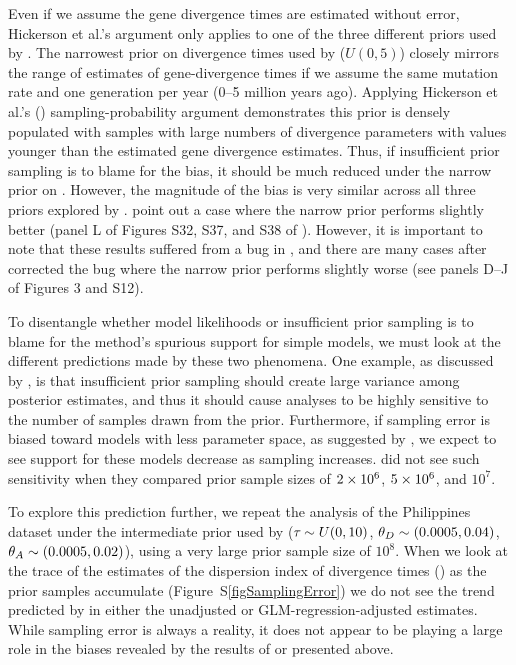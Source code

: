 Even if we assume the gene divergence times are estimated without error,
Hickerson et al.'s \citeyear{Hickerson2013} argument only applies to one of the
three different priors used by \citet{Oaks2012}.
The narrowest prior on divergence times used by \citet{Oaks2012} ($U(0, 5)$)
closely mirrors the range of estimates of gene-divergence times if we assume
the same mutation rate and one generation per year (0--5 million years ago).
Applying Hickerson et al.'s (\citeyear{Hickerson2013}) sampling-probability
argument demonstrates this prior is densely populated with samples with large
numbers of divergence parameters with values younger than the estimated gene
divergence estimates.
Thus, if insufficient prior sampling is to blame for the bias, it should be
much reduced under the narrow prior on \divt{}.
However, the magnitude of the bias is very similar across all three priors
explored by \citet{Oaks2012}.
\citet{Hickerson2013} point out a case where the narrow prior performs
slightly better (panel L of Figures S32, S37, and S38 of \citet{Oaks2012}).
However, it is important to note that these results suffered from a bug
in \msb, and there are many cases after \citet{Oaks2012} corrected the 
bug where the narrow prior performs slightly worse (see panels D--J of
Figures 3 and S12).

To disentangle whether model likelihoods or insufficient prior sampling is to
blame for the method's spurious support for simple models, we must look at the
different predictions made by these two phenomena.
One example, as discussed by \citet{Oaks2012}, is that insufficient prior
sampling should create large variance among posterior estimates, and thus it
should cause analyses to be highly sensitive to the number of samples drawn
from the prior.
Furthermore, if sampling error is biased toward models with less
parameter space, as suggested by \citet{Hickerson2013}, we expect to see
support for these models decrease as sampling increases.
\citet{Oaks2012} did not see such sensitivity when they compared prior sample
sizes of $2\times 10^{6}$, $5\times 10^{6}$, and $10^7$.

To explore this prediction further, we repeat the analysis of the Philippines
dataset under the intermediate prior used by \citet{Oaks2012} ($\tau_{} \sim
U(0, 10)$, $\meanDescendantTheta{} \sim (0.0005, 0.04)$, $\ancestralTheta{}
\sim (0.0005, 0.02)$), using a very large prior sample size of $10^8$.
When we look at the trace of the estimates of the dispersion index of
divergence times (\vmratio{}) as the prior samples accumulate
(Figure~S\ref{figSamplingError}) we do not see the trend predicted by
\citet{Hickerson2013} in either the unadjusted or GLM-regression-adjusted
estimates.
While sampling error is always a reality, it does not appear to be playing a
large role in the biases revealed by the results of \citet{Oaks2012} or
presented above.


